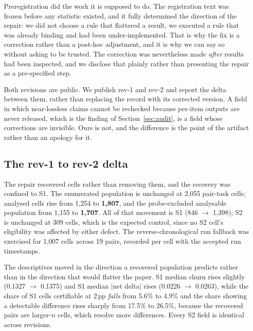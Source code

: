 Preregistration did the work it is supposed to do. The registration
text was frozen before any statistic existed, and it fully determined the
direction of the repair: we did not choose a rule that flattered a result, we
executed a rule that was already binding and had been under-implemented. That
is why the fix is a correction rather than a post-hoc adjustment, and it is why
we can say so without asking to be trusted. The correction was nevertheless made
\emph{after} results had been inspected, and we disclose that plainly rather
than presenting the repair as a pre-specified step.

Both revisions are public. We publish rev-1 and rev-2 and report the
delta between them, rather than replacing the record with its corrected version.
A field in which near-lossless claims cannot be rechecked because per-item
outputs are never released, which is the finding of Section~\ref{sec:audit}, is
a field whose corrections are invisible. Ours is not, and the difference is the point of
the artifact rather than an apology for it.

\subsection{The rev-1 to rev-2 delta}
\label{app:prereg:rev2delta}

The repair recovered cells rather than removing them, and the recovery was
confined to S1. The enumerated population is unchanged at 2{,}055 pair-task
cells; analysed cells rise from 1{,}254 to \textbf{1{,}807}, and the
probe-excluded analysable population from 1{,}155 to \textbf{1{,}707}. All of
that movement is S1 (846 $\to$ 1{,}398); S2 is unchanged at 309 cells, which is
the expected control, since no S2 cell's eligibility was affected by either
defect. The reverse-chronological run fallback was exercised for 1{,}007 cells
across 19 pairs, recorded per cell with the accepted run timestamps.

The descriptives moved in the direction a recovered population predicts rather
than in the direction that would flatter the paper. S1 median churn rises
slightly (0.1327 $\to$ 0.1375) and S1 median $|$net delta$|$ rises
(0.0226 $\to$ 0.0263), while the share of S1 cells certifiable at 2\,pp
\emph{falls} from 5.6\% to 4.9\% and the share showing a detectable difference
rises sharply from 17.5\% to 26.5\%, because the recovered pairs are larger-$n$
cells, which resolve more differences. Every S2 field is identical across revisions.

